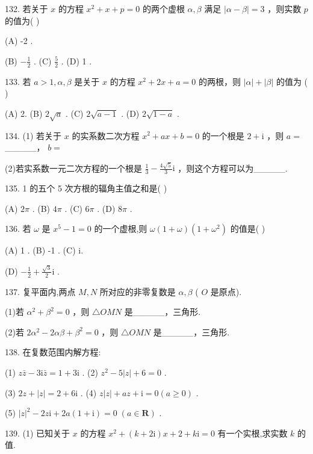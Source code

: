\documentclass[10pt]{article}
\begin{document}
132. 若关于 \(x\) 的方程 \({x}^{2} + x + p = 0\) 的两个虚根 \(\alpha ,\beta\) 满足 \(\left| {\alpha  - \beta }\right|  = 3\) ，则实数 \(p\) 的值为( )

(A) -2 .

(B) \(- \frac{1}{2}\) . (C) \(\frac{5}{2}\) . (D) 1 .

133. 若 \(a > 1,\alpha ,\beta\) 是关于 \(x\) 的方程 \({x}^{2} + {2x} + a = 0\) 的两根，则 \(\left| \alpha \right|  + \left| \beta \right|\) 的值为 ( )

(A) 2. (B) \(2\sqrt{a}\) . (C) \(2\sqrt{a - 1}\) . (D) \(2\sqrt{1 - a}\) .

134. (1) 若关于 \(x\) 的实系数二次方程 \({x}^{2} + {ax} + b = 0\) 的一个根是 \(2 + \mathrm{i}\) ，则 \(a =\) \_\_\_\_\_， \(b =\)

(2)若实系数一元二次方程的一个根是 \(\frac{1}{3} - \frac{4\sqrt{5}}{3}\mathrm{i}\) ，则这个方程可以为\_\_\_\_\_.

135. 1 的五个 5 次方根的辐角主值之和是( )

(A) \({2\pi }\) . (B) \({4\pi }\) . (C) \({6\pi }\) . (D) \({8\pi }\) .

136. 若 \(\omega\) 是 \({x}^{5} - 1 = 0\) 的一个虚根,则 \(\omega \left( {1 + \omega }\right) \left( {1 + {\omega }^{2}}\right)\) 的值是( )

(A) 1 . (B) -1 . (C) i.

(D) \(- \frac{1}{2} + \frac{\sqrt{3}}{2}\mathrm{i}\) .

137. 复平面内,两点 \(M,N\) 所对应的非零复数是 \(\alpha ,\beta\) ( \(O\) 是原点).

(1)若 \({\alpha }^{2} + {\beta }^{2} = 0\) ，则 \(\bigtriangleup  {OMN}\) 是\_\_\_\_\_，三角形.

(2)若 \(2{\alpha }^{2} - {2\alpha \beta } + {\beta }^{2} = 0\) ，则 \(\bigtriangleup  {OMN}\) 是\_\_\_\_\_，三角形.

138. 在复数范围内解方程:

(1) \(z\bar{z} - 3\mathrm{i}\bar{z} = 1 + 3\mathrm{i}\) . (2) \({z}^{2} - 5\left| z\right|  + 6 = 0\) .

(3) \({2z} + \left| z\right|  = 2 + 6\mathrm{i}\) . (4) \(z\left| z\right|  + {az} + \mathrm{i} = 0\left( {a \geq  0}\right)\) .

(5) \({\left| z\right| }^{2} - {2z}\mathrm{i} + {2a}\left( {1 + \mathrm{i}}\right)  = 0\;\left( {a \in  \mathbf{R}}\right)\) .

139. (1) 已知关于 \(x\) 的方程 \({x}^{2} + \left( {k + {2\mathrm{i}}}\right) x + 2 + k\mathrm{i} = 0\) 有一个实根,求实数 \(k\) 的值.
\end{document}
